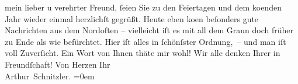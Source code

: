 \begin{ledgroupsized}[t]{13cm}
           \pstart
           mein lieber u verehrter Freund, ſeien Sie zu den Feiertagen und dem
                  ko{\geminationm}enden Jahr wieder einmal herzlichſt gegrüßt. Heute
               eben ko{\geminationm}en beſonders gute Nachrichten aus dem Nordoſten
               – vielleicht iſt es mit all dem Graun doch früher zu Ende als wie befürchtet. Hier
               iſt alles in ſchönſster Ordnung, – und man iſt voll Zuverſicht. Ein Wort von Ihnen
               thäte mir wohl! Wir alle {\pb}denken Ihrer in
               Freundſchaft!\pend
           \pstart
           Von Herzen Ihr{\\[\baselineskip]}\spacefill\mbox{Arthur Schnitzler.}\pend
           \leftskip=0em{}
         
         \endnumbering{}\end{ledgroupsized}  \newcommand{\dateiname}{L02200}\newcommand{\titel}{Arthur Schnitzler an Georg Brandes, 18. 12. 1914}\newcommand{\editorInnen}{Martin Anton Müller und Gerd-Hermann Susen}
      